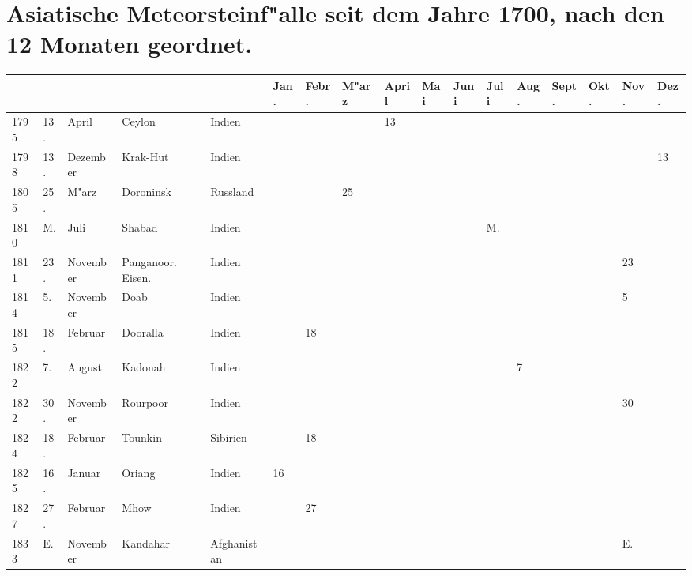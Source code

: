 \documentclass[a4paper, 8pt, oneside, polutonikogreek, german]{article}
\begin{document}
\section{Asiatische Meteorsteinf"alle seit dem Jahre 1700, nach den 12 Monaten geordnet.}
\vspace*{\fill}
\clearpage
\begin{landscape}
\vspace*{\fill}
\begin{table}[H]
    \centering
    \footnotesize
    \begin{longtable}{|l|l|l|l|l|l|l|l|l|l|l|l|l|l|l|l|l|}
    \hline
         & & & & & Jan. & Febr. & M"arz & April & Mai & Juni & Juli & Aug. & Sept. & Okt. & Nov. & Dez. \\ \hline
        1795 & 13. & April & Ceylon & Indien & ~ & ~ & ~ & 13 & ~ & ~ & ~ & ~ & ~ & ~ & ~ & ~ \\ \hline
        1798 & 13. & Dezember & Krak-Hut & Indien & ~ & ~ & ~ & ~ & ~ & ~ & ~ & ~ & ~ & ~ & ~ & 13 \\ \hline
        1805 & 25. & M"arz & Doroninsk & Russland & ~ & ~ & 25 & ~ & ~ & ~ & ~ & ~ & ~ & ~ & ~ & ~ \\ \hline
        1810 & M. & Juli & Shabad & Indien & ~ & ~ & ~ & ~ & ~ & ~ & M. & ~ & ~ & ~ & ~ & ~ \\ \hline
        1811 & 23. & November & Panganoor. Eisen. & Indien & ~ & ~ & ~ & ~ & ~ & ~ & ~ & ~ & ~ & ~ & 23 & ~ \\ \hline
        1814 & 5. & November & Doab & Indien & ~ & ~ & ~ & ~ & ~ & ~ & ~ & ~ & ~ & ~ & 5 & ~ \\ \hline
        1815 & 18. & Februar & Dooralla & Indien & ~ & 18 & ~ & ~ & ~ & ~ & ~ & ~ & ~ & ~ & ~ & ~ \\ \hline
        1822 & 7. & August & Kadonah & Indien & ~ & ~ & ~ & ~ & ~ & ~ & ~ & 7 & ~ & ~ & ~ & ~ \\ \hline
        1822 & 30. & November & Rourpoor & Indien & ~ & ~ & ~ & ~ & ~ & ~ & ~ & ~ & ~ & ~ & 30 & ~ \\ \hline
        1824 & 18. & Februar & Tounkin & Sibirien & ~ & 18 & ~ & ~ & ~ & ~ & ~ & ~ & ~ & ~ & ~ & ~ \\ \hline
        1825 & 16. & Januar & Oriang & Indien & 16 & ~ & ~ & ~ & ~ & ~ & ~ & ~ & ~ & ~ & ~ & ~ \\ \hline
        1827 & 27. & Februar & Mhow & Indien & ~ & 27 & ~ & ~ & ~ & ~ & ~ & ~ & ~ & ~ & ~ & ~ \\ \hline
        1833 & E. & November & Kandahar & Afghanistan & ~ & ~ & ~ & ~ & ~ & ~ & ~ & ~ & ~ & ~ & E. & ~ \\ \hline

\end{longtable}
\end{table}
\end{landscape}
\end{document}
